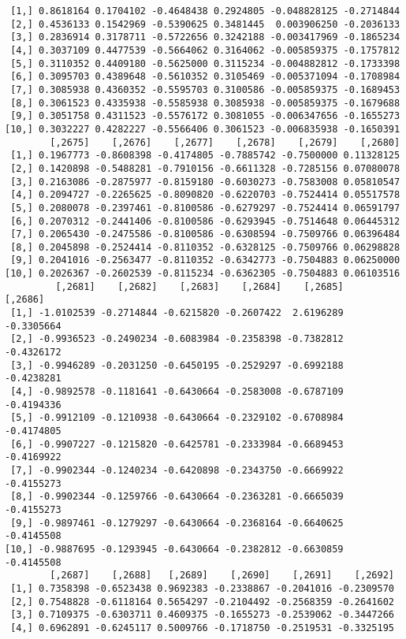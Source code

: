 \documentclass[
  letterpaper,
  DIV=11,
  numbers=noendperiod]{scrreprt}
\begin{document}
\begin{verbatim}
 [1,] 0.8618164 0.1704102 -0.4648438 0.2924805 -0.048828125 -0.2714844
 [2,] 0.4536133 0.1542969 -0.5390625 0.3481445  0.003906250 -0.2036133
 [3,] 0.2836914 0.3178711 -0.5722656 0.3242188 -0.003417969 -0.1865234
 [4,] 0.3037109 0.4477539 -0.5664062 0.3164062 -0.005859375 -0.1757812
 [5,] 0.3110352 0.4409180 -0.5625000 0.3115234 -0.004882812 -0.1733398
 [6,] 0.3095703 0.4389648 -0.5610352 0.3105469 -0.005371094 -0.1708984
 [7,] 0.3085938 0.4360352 -0.5595703 0.3100586 -0.005859375 -0.1689453
 [8,] 0.3061523 0.4335938 -0.5585938 0.3085938 -0.005859375 -0.1679688
 [9,] 0.3051758 0.4311523 -0.5576172 0.3081055 -0.006347656 -0.1655273
[10,] 0.3032227 0.4282227 -0.5566406 0.3061523 -0.006835938 -0.1650391
        [,2675]    [,2676]    [,2677]    [,2678]    [,2679]    [,2680]
 [1,] 0.1967773 -0.8608398 -0.4174805 -0.7885742 -0.7500000 0.11328125
 [2,] 0.1420898 -0.5488281 -0.7910156 -0.6611328 -0.7285156 0.07080078
 [3,] 0.2163086 -0.2875977 -0.8159180 -0.6030273 -0.7583008 0.05810547
 [4,] 0.2094727 -0.2265625 -0.8090820 -0.6220703 -0.7524414 0.05517578
 [5,] 0.2080078 -0.2397461 -0.8100586 -0.6279297 -0.7524414 0.06591797
 [6,] 0.2070312 -0.2441406 -0.8100586 -0.6293945 -0.7514648 0.06445312
 [7,] 0.2065430 -0.2475586 -0.8100586 -0.6308594 -0.7509766 0.06396484
 [8,] 0.2045898 -0.2524414 -0.8110352 -0.6328125 -0.7509766 0.06298828
 [9,] 0.2041016 -0.2563477 -0.8110352 -0.6342773 -0.7504883 0.06250000
[10,] 0.2026367 -0.2602539 -0.8115234 -0.6362305 -0.7504883 0.06103516
         [,2681]    [,2682]    [,2683]    [,2684]    [,2685]    [,2686]
 [1,] -1.0102539 -0.2714844 -0.6215820 -0.2607422  2.6196289 -0.3305664
 [2,] -0.9936523 -0.2490234 -0.6083984 -0.2358398 -0.7382812 -0.4326172
 [3,] -0.9946289 -0.2031250 -0.6450195 -0.2529297 -0.6992188 -0.4238281
 [4,] -0.9892578 -0.1181641 -0.6430664 -0.2583008 -0.6787109 -0.4194336
 [5,] -0.9912109 -0.1210938 -0.6430664 -0.2329102 -0.6708984 -0.4174805
 [6,] -0.9907227 -0.1215820 -0.6425781 -0.2333984 -0.6689453 -0.4169922
 [7,] -0.9902344 -0.1240234 -0.6420898 -0.2343750 -0.6669922 -0.4155273
 [8,] -0.9902344 -0.1259766 -0.6430664 -0.2363281 -0.6665039 -0.4155273
 [9,] -0.9897461 -0.1279297 -0.6430664 -0.2368164 -0.6640625 -0.4145508
[10,] -0.9887695 -0.1293945 -0.6430664 -0.2382812 -0.6630859 -0.4145508
        [,2687]    [,2688]   [,2689]    [,2690]    [,2691]    [,2692]
 [1,] 0.7358398 -0.6523438 0.9692383 -0.2338867 -0.2041016 -0.2309570
 [2,] 0.7548828 -0.6118164 0.5654297 -0.2104492 -0.2568359 -0.2641602
 [3,] 0.7109375 -0.6303711 0.4609375 -0.1655273 -0.2539062 -0.3447266
 [4,] 0.6962891 -0.6245117 0.5009766 -0.1718750 -0.2519531 -0.3325195

\end{verbatim}
\end{document}
